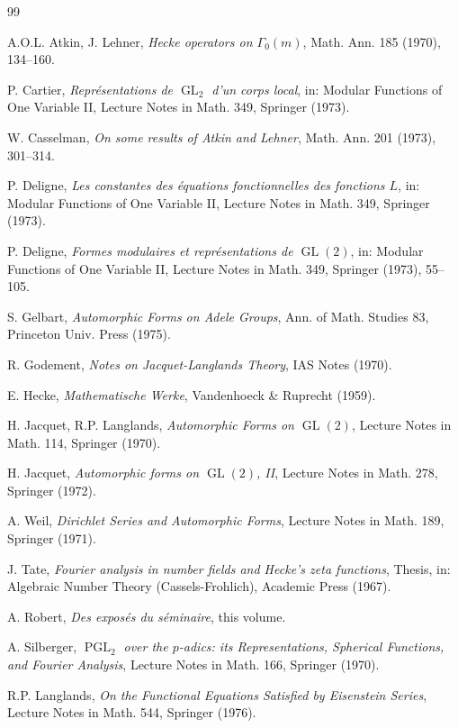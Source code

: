 \documentclass[11pt,a4paper]{amsart}
\theoremstyle{plain}
\theoremstyle{definition}
\theoremstyle{remark}
\DeclareMathOperator{\GL}{GL}
\DeclareMathOperator{\PGL}{PGL}
\begin{document}
\begin{thebibliography}{99}

 A.O.L. Atkin, J. Lehner, \textit{Hecke operators on $\Gamma_0(m)$}, Math. Ann. 185 (1970), 134--160.

 P. Cartier, \textit{Repr\'esentations de $\GL_2$ d'un corps local}, in: Modular Functions of One Variable II, Lecture Notes in Math. 349, Springer (1973).

 W. Casselman, \textit{On some results of Atkin and Lehner}, Math. Ann. 201 (1973), 301--314.

 P. Deligne, \textit{Les constantes des \'equations fonctionnelles des fonctions $L$}, in: Modular Functions of One Variable II, Lecture Notes in Math. 349, Springer (1973).

 P. Deligne, \textit{Formes modulaires et repr\'esentations de $\GL(2)$}, in: Modular Functions of One Variable II, Lecture Notes in Math. 349, Springer (1973), 55--105.

 S. Gelbart, \textit{Automorphic Forms on Adele Groups}, Ann. of Math. Studies 83, Princeton Univ. Press (1975).

 R. Godement, \textit{Notes on Jacquet-Langlands Theory}, IAS Notes (1970).

 E. Hecke, \textit{Mathematische Werke}, Vandenhoeck \& Ruprecht (1959).

 H. Jacquet, R.P. Langlands, \textit{Automorphic Forms on $\GL(2)$}, Lecture Notes in Math. 114, Springer (1970).

 H. Jacquet, \textit{Automorphic forms on $\GL(2)$, II}, Lecture Notes in Math. 278, Springer (1972).

 A. Weil, \textit{Dirichlet Series and Automorphic Forms}, Lecture Notes in Math. 189, Springer (1971).

 J. Tate, \textit{Fourier analysis in number fields and Hecke's zeta functions}, Thesis, in: Algebraic Number Theory (Cassels-Frohlich), Academic Press (1967).

 A. Robert, \textit{Des expos\'es du s\'eminaire}, this volume.

 A. Silberger, \textit{$\PGL_2$ over the $p$-adics: its Representations, Spherical Functions, and Fourier Analysis}, Lecture Notes in Math. 166, Springer (1970).

 R.P. Langlands, \textit{On the Functional Equations Satisfied by Eisenstein Series}, Lecture Notes in Math. 544, Springer (1976).

\end{thebibliography}
\end{document}
